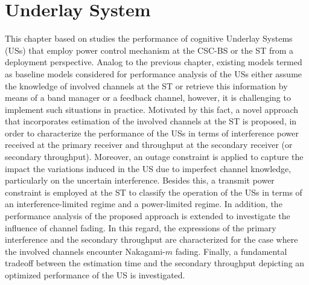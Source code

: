 \chapter{Underlay System}
\label{chap:US}


This chapter based on  studies the performance of cognitive Underlay Systems (USs) that employ power control mechanism at the CSC-BS or the ST from a deployment perspective. Analog to the previous chapter, existing models termed as baseline models considered for performance analysis of the USs either assume the knowledge of involved channels at the ST or retrieve this information by means of a band manager or a feedback channel, however, it is challenging to implement such situations in practice. Motivated by this fact, a novel approach that incorporates estimation of the involved channels at the ST is proposed, in order to characterize the performance of the USs in terms of interference power received at the primary receiver and throughput at the secondary receiver (or secondary throughput). Moreover, an outage constraint is applied to capture the impact the variations induced in the US due to imperfect channel knowledge, particularly on the uncertain interference. 
Besides this, a transmit power constraint is employed at the ST to classify the operation of the USs in terms of an interference-limited regime and a power-limited regime. In addition, the performance analysis of the proposed approach is extended to investigate the influence of channel fading. In this regard, the expressions of the primary interference and the secondary throughput are characterized for the case where the involved channels encounter Nakagami-$m$ fading. Finally, a fundamental tradeoff between the estimation time and the secondary throughput depicting an optimized performance of the US is investigated. 

